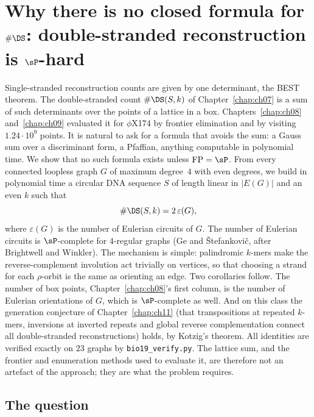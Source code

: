 \chapter[Double-stranded reconstruction is \#P-hard]{\texorpdfstring{Why there is no closed formula for $\#\DS$: double-stranded reconstruction is $\sP$-hard}{Why there is no closed formula for #DS: double-stranded reconstruction is #P-hard}}\label{chap:ch10}
\begin{chaptersummary}
Single-stranded reconstruction counts are given by one determinant, the BEST theorem. The
double-stranded count $\#\DS(S,k)$ of Chapter~\ref{chap:ch07} is a sum of such determinants over the points of a lattice
in a box. Chapters~\ref{chap:ch08} and~\ref{chap:ch09} evaluated it for $\phi$X174 by frontier elimination and by visiting
$1.24\cdot10^9$ points. It is natural to ask for a formula that avoids the sum: a Gauss sum over a
discriminant form, a Pfaffian, anything computable in polynomial time. We show that no such formula
exists unless $\mathrm{FP}=\sP$. From every connected loopless graph $G$ of maximum degree~$4$ with even
degrees, we build in polynomial time a circular DNA sequence $S$ of length linear in $|E(G)|$ and an
even $k$ such that
\[
\#\DS(S,k)=2\,\varepsilon(G),
\]
where $\varepsilon(G)$ is the number of Eulerian circuits of $G$. The number of Eulerian circuits is
$\sP$-complete for $4$-regular graphs (Ge and \v Stefankovi\v c, after Brightwell and Winkler). The
mechanism is simple: palindromic $k$-mers make the reverse-complement involution act trivially on
vertices, so that choosing a strand for each $\rho$-orbit is the same as orienting an edge. Two
corollaries follow. The number of box points, Chapter~\ref{chap:ch08}'s first column, is the number of Eulerian
orientations of $G$, which is $\sP$-complete as well. And on this class the generation conjecture of
Chapter~\ref{chap:ch11} (that transpositions at repeated $k$-mers, inversions at inverted repeats
and global reverse complementation connect all double-stranded reconstructions) holds, by
Kotzig's theorem. All identities are verified exactly on $23$ graphs by
\texttt{bio19\_verify.py}. The lattice sum, and the frontier and enumeration methods used to evaluate
it, are therefore not an artefact of the approach; they are what the problem requires.
\end{chaptersummary}

\section{The question}\label{ch10:sec:q}

